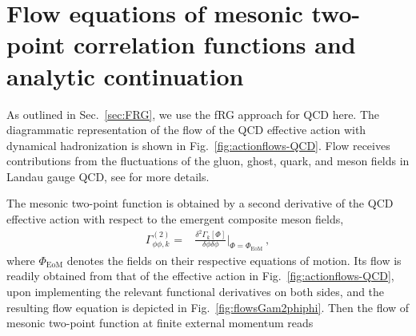 \documentclass[reprint,english,superscriptaddress,preprintnumbers,amsmath,amssymb,aps,prd,nofootinbib]{revtex4-2}
\def\Fig#1{Fig.~\ref{#1}}
\def\Sec#1{Sec.~\ref{#1}}
\begin{document}


\appendix





\section{Flow equations of mesonic two-point correlation functions and analytic continuation}
\label{app:flow}

As outlined in \Sec{sec:FRG}, we use the fRG approach for QCD here. 
The diagrammatic representation of the flow of the QCD effective action with dynamical hadronization is shown in \Fig{fig:actionflows-QCD}. Flow receives contributions from the fluctuations of the gluon, ghost, quark, and meson fields in Landau gauge QCD, see \cite{Fu:2019hdw} for more details. 

The mesonic two-point function is obtained by a second derivative of the QCD effective action with respect to the emergent composite meson fields, 
\begin{align}
  \Gamma^{(2)}_{\phi \phi, k}=& \frac{\delta^2 \Gamma_k[\Phi]}{\delta \phi \delta \phi}\bigg|_{\Phi=\Phi_{\mathrm{EoM}}}\,,
  \label{eq:Gam2phiphi}
\end{align}
%
where $\Phi_{\mathrm{EoM}}$ denotes the fields on their respective equations of motion. Its flow is readily obtained from that of the effective action in \Fig{fig:actionflows-QCD}, upon implementing the relevant functional derivatives on both sides, and the resulting flow equation is depicted in \Fig{fig:flowsGam2phiphi}. Then the flow of mesonic two-point function at finite external momentum reads
\end{document}
